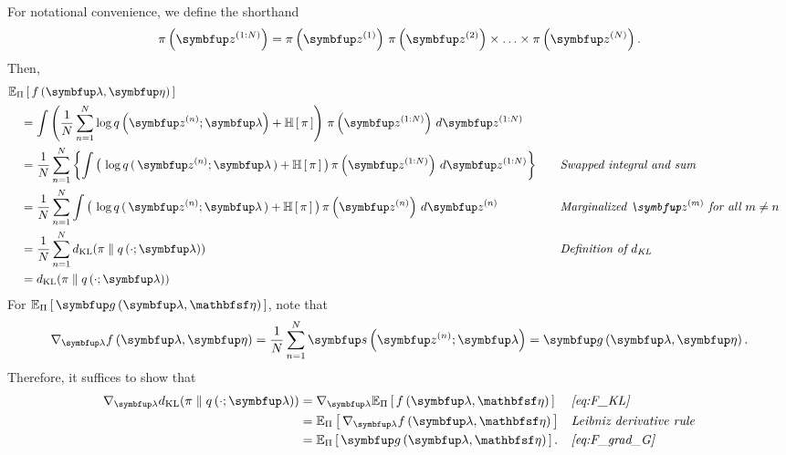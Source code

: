 \begin{proofEnd}
  For notational convenience, we define the shorthand
  \begin{align*}
    \pi\left(\vz^{(1:N)}\right) = \pi\left(\vz^{(1)}\right) \, \pi\left(\vz^{(2)}\right) \times \ldots \times \pi\left(\vz^{(N)}\right).
  \end{align*}
  Then,
  \begin{alignat}{2}
    &\Esub{\Pi}{ f\left(\vlambda, \veta\right) }
    \nonumber
    \\
    &\quad=
    \int \left( \frac{1}{N} \sum^{N}_{n=1} \log q\left(\vz^{(n)}; \vlambda\right) + \mathbb{H}\left[\,\pi\,\right]\right) \, \pi\left(\vz^{(1:N)}\right) \, d\vz^{(1:N)}
    \nonumber
    \\
    &\quad=
     \frac{1}{N} \sum^{N}_{n=1} \left\{ \int \big(\, \log q\,(\,\vz^{(n)}; \vlambda\,) + \mathbb{H}\,[\,\pi\,] \,\big) \, \pi\left(\vz^{(1:N)}\right) \, d\vz^{(1:N)} \right\}
     &&\quad{\text{\textit{Swapped integral and sum}}}
    \nonumber
    \\
    &\quad=
    \frac{1}{N} \sum^{N}_{n=1} \int \big(\, \log q\,(\,\vz^{(n)}; \vlambda\,) + \mathbb{H}\,[\,\pi\,] \,\big) \, \pi\left(\vz^{(n)}\right) \, d\vz^{(n)}
    &&\quad{\text{\textit{Marginalized \(\vz^{(m)}\) for all \(m \neq n\)}}}
    \nonumber
    \\
    &\quad=
    \frac{1}{N} \sum^{N}_{n=1} \DKL{\pi}{q\left(\cdot; \vlambda\right)}
    \nonumber
    &&\quad{\text{\textit{Definition of \(d_{\text{KL}}\)}}}
    \\
    &\quad=
    \DKL{\pi}{q\left(\cdot; \vlambda\right)}\label{eq:F_KL}
  \end{alignat}
  For \(\Esub{\Pi}{ \vg\left(\vlambda, \rvveta\right) }\), note that 
  \begin{align}
    \nabla_{\vlambda} f\left(\vlambda, \veta\right) = \frac{1}{N} \sum^{N}_{n=1} \vs\left(\vz^{(n)}; \vlambda\right) = \vg\left(\vlambda, \veta\right).\label{eq:F_grad_G}
  \end{align}
  Therefore, it suffices to show that
  \begin{align*}
    \nabla_{\vlambda} \DKL{\pi}{q\left(\cdot; \vlambda\right)}
    &=
    \nabla_{\vlambda} \Esub{\Pi}{ f\left(\vlambda, \rvveta\right) }
    &&\text{\textit{\cref{eq:F_KL}}}
    \\
    &=
    \Esub{\Pi}{ \nabla_{\vlambda}  f\left(\vlambda, \rvveta\right) }
    &&\text{\textit{{Leibniz derivative rule}}}
    \\
    &=
    \Esub{\Pi}{ \vg\left(\vlambda, \rvveta\right) }.
    &&\text{\textit{\cref{eq:F_grad_G}}}
  \end{align*}
\end{proofEnd}


